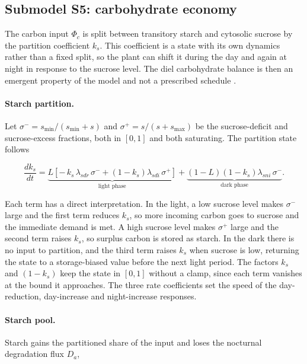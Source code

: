 \subsection{Submodel S5: carbohydrate economy}
\label{sec:carbohydrates}

The carbon input $\Phi_c$ is split between transitory starch and cytosolic sucrose
by the partition coefficient $k_s$. This coefficient is a state with its own
dynamics rather than a fixed split, so the plant can shift it during the day and
again at night in response to the sucrose level. The diel carbohydrate balance is
then an emergent property of the model and not a prescribed schedule
\citep{Stitt2012,Mengin2017}.

\paragraph{Starch partition.}
Let $\sigma^{-} = s_{\min}/(s_{\min}+s)$ and
$\sigma^{+} = s/(s+s_{\max})$ be the sucrose-deficit and sucrose-excess
fractions, both in $[0,1]$ and both saturating. The partition state follows

\begin{equation}
\frac{dk_s}{dt}
= \underbrace{L\left[
-\,k_s\,\lambda_{sdr}\,\sigma^{-}
+\left(1-k_s\right)\lambda_{sdi}\,\sigma^{+}
\right]}_{\text{light phase}}
+\underbrace{\left(1-L\right)\left(1-k_s\right)\lambda_{sni}\,\sigma^{-}}_{\text{dark phase}} .
\label{eq:dks}
\end{equation}

Each term has a direct interpretation. In the light, a low sucrose level makes
$\sigma^{-}$ large and the first term reduces $k_s$, so more incoming carbon goes
to sucrose and the immediate demand is met. A high sucrose level makes
$\sigma^{+}$ large and the second term raises $k_s$, so surplus carbon is stored
as starch. In the dark there is no input to partition, and the third term raises
$k_s$ when sucrose is low, returning the state to a storage-biased value before
the next light period. The factors $k_s$ and $(1-k_s)$ keep the state in $[0,1]$
without a clamp, since each term vanishes at the bound it approaches. The three
rate coefficients set the speed of the day-reduction, day-increase and
night-increase responses.

\paragraph{Starch pool.}
Starch gains the partitioned share of the input and loses the nocturnal
degradation flux $D_a$,

